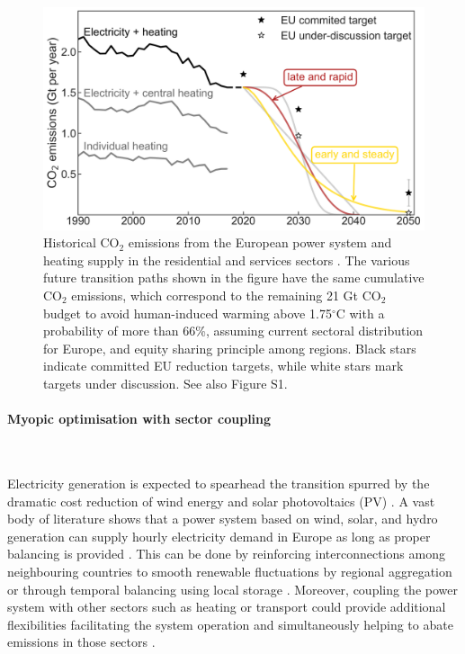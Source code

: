 \documentclass[5p]{elsarticle} %
\begin{document}
\begin{figure}[!h]
\centering
	\includegraphics[width=\columnwidth]{../figures/carbon_budget.png}
\caption{Historical CO$_2$ emissions from the European power system and heating supply in the residential and services sectors \cite{UNFCCC_inventory}. The various future transition paths shown in the figure have the same cumulative CO$_2$ emissions, which correspond to the remaining 21 Gt CO$_2$ budget to avoid human-induced warming above 1.75$^{\circ}$C with a probability of more than 66\%, assuming current sectoral distribution for Europe, and equity sharing principle among regions. Black stars indicate committed EU reduction targets, while white stars mark targets under discussion. See also Figure S1.} \label{fig_carbon_budget} 
\end{figure}


\FloatBarrier

\paragraph{\textbf{Myopic optimisation with sector coupling}} \

Electricity generation is expected to spearhead the transition spurred by the dramatic cost reduction of wind energy \cite{Lantz_2012} and solar photovoltaics (PV) \cite{Creutzig_2017, Haegel_2019}. A vast body of literature shows that a power system based on wind, solar, and hydro generation can supply hourly electricity demand in Europe as long as proper balancing is provided \cite{Eriksen_2017, Schlachtberger_2017, Gils_2017a, Brown_response}. This can be done by reinforcing interconnections among neighbouring countries \cite{Rodriguez_2014} to smooth renewable fluctuations by regional aggregation or through temporal balancing using local storage \cite{Rasmussen_2012, Cebulla_2017, Victoria_2019_storage}. Moreover, coupling the power system with other sectors such as heating or transport could provide additional flexibilities facilitating the system operation and simultaneously helping to abate emissions in those sectors \cite{Connolly_2016, Brown_2018, Child_2019}. \\
\end{document}
